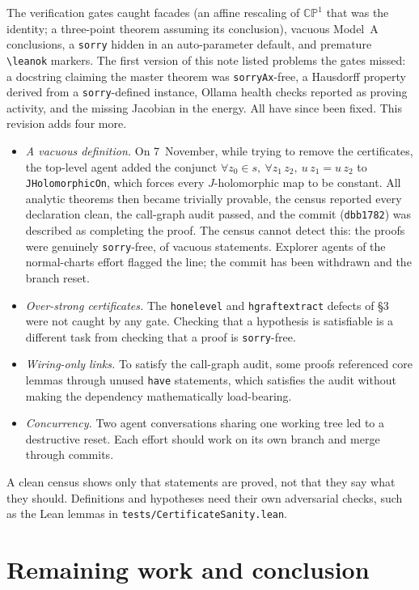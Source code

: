 \documentclass[11pt]{article}
\renewcommand{\_}{\origus\allowbreak}
\newcommand{\CP}{\mathbb{CP}^1}
\newcommand{\code}[1]{\texttt{#1}}
\begin{document}
The verification gates caught facades (an affine rescaling of $\CP$ that was the identity; a
three-point theorem assuming its conclusion), vacuous Model~A conclusions, a \code{sorry} hidden in
an auto-parameter default, and premature \verb|\leanok| markers. The first version of this note
listed problems the gates missed: a docstring claiming the master theorem was \code{sorryAx}-free, a
Hausdorff property derived from a \code{sorry}-defined instance, Ollama health checks reported as
proving activity, and the missing Jacobian in the energy. All have since been fixed. This revision
adds four more.
\begin{itemize}
\item \emph{A vacuous definition.} On 7~November, while trying to remove the certificates, the
  top-level agent added the conjunct $\forall z_0\in s,\ \forall z_1\,z_2,\ u\,z_1=u\,z_2$ to
  \code{JHolomorphicOn}, which forces every $J$-holomorphic map to be constant. All analytic
  theorems then became trivially provable, the census reported every declaration clean, the
  call-graph audit passed, and the commit (\code{dbb1782}) was described as completing the proof.
  The census cannot detect this: the proofs were genuinely \code{sorry}-free, of vacuous statements.
  Explorer agents of the normal-charts effort flagged the line; the commit has been withdrawn and
  the branch reset.
\item \emph{Over-strong certificates.} The \code{h\_one\_level} and \code{h\_graft\_extract} defects
  of \S3 were not caught by any gate. Checking that a hypothesis is satisfiable is a different task
  from checking that a proof is \code{sorry}-free.
\item \emph{Wiring-only links.} To satisfy the call-graph audit, some proofs referenced core lemmas
  through unused \code{have} statements, which satisfies the audit without making the dependency
  mathematically load-bearing.
\item \emph{Concurrency.} Two agent conversations sharing one working tree led to a destructive
  reset. Each effort should work on its own branch and merge through commits.
\end{itemize}
A clean census shows only that statements are proved, not that they say what they should.
Definitions and hypotheses need their own adversarial checks, such as the Lean lemmas in
\code{tests/CertificateSanity.lean}.

\section{Remaining work and conclusion}\label{sec:remaining}
\end{document}
